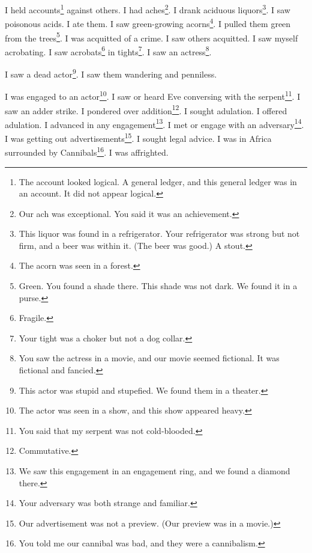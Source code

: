 \documentclass[12pt]{book}
\begin{document}
 I held accounts\footnote{The account looked logical. A general ledger, and this general ledger was in an account. It did not appear logical.} against others. I had aches\footnote{Our ach was exceptional. You said it was an achievement.}. I drank aciduous liquors\footnote{This liquor was found in a refrigerator. Your refrigerator was strong but not firm, and a beer was within it. (The beer was good.) A stout.}. I saw poisonous acids. I ate them. I saw green-growing acorns\footnote{The acorn was seen in a forest.}. I pulled them green from the trees\footnote{Green. You found a shade there. This shade was not dark. We found it in a purse.}. I was acquitted of a crime. I saw others acquitted. I saw myself acrobating. I saw acrobats\footnote{Fragile.} in tights\footnote{Your tight was a choker but not a dog collar.}. I saw an actress\footnote{You saw the actress in a movie, and our movie seemed fictional. It was fictional and fancied.}. 

 I saw a dead actor\footnote{This actor was stupid and stupefied. We found them in a theater.}. I saw them wandering and penniless. 

 I was engaged to an actor\footnote{The actor was seen in a show, and this show appeared heavy.}. I saw or heard Eve conversing with the serpent\footnote{You said that my serpent was not cold-blooded.}. I saw an adder strike. I pondered over addition\footnote{Commutative.}. I sought adulation. I offered adulation. I advanced in any engagement\footnote{We saw this engagement in an engagement ring, and we found a diamond there.}. I met or engage with an adversary\footnote{Your adversary was both strange and familiar.}. I was getting out advertisements\footnote{Our advertisement was not a preview. (Our preview was in a movie.)}. I sought legal advice. I was in Africa surrounded by Cannibals\footnote{You told me our cannibal was bad, and they were a cannibalism.}. I was affrighted. 
\end{document}

